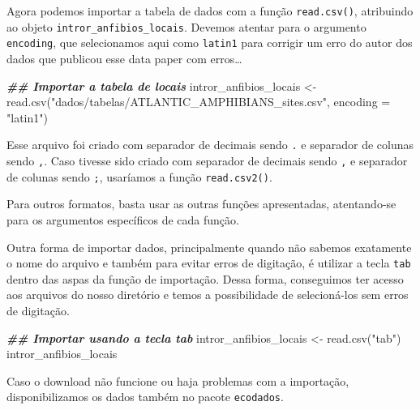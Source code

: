 \documentclass[
]{book}
\newenvironment{Shaded}{\begin{snugshade}}{\end{snugshade}}
\newcommand{\AttributeTok}[1]{\textcolor[rgb]{0.61,0.61,0.61}{#1}}
\newcommand{\DocumentationTok}[1]{\textcolor[rgb]{0.37,0.37,0.37}{\textbf{\textit{#1}}}}
\newcommand{\FunctionTok}[1]{\textcolor[rgb]{0,0,0}{#1}}
\newcommand{\NormalTok}[1]{#1}
\newcommand{\OtherTok}[1]{\textcolor[rgb]{0.37,0.37,0.37}{#1}}
\newcommand{\StringTok}[1]{\textcolor[rgb]{0.5,0.5,0.5}{#1}}
\begin{document}
Agora podemos importar a tabela de dados com a função \texttt{read.csv()}, atribuindo ao objeto \texttt{intror\_anfibios\_locais}. Devemos atentar para o argumento \texttt{encoding}, que selecionamos aqui como \texttt{latin1} para corrigir um erro do autor dos dados que publicou esse data paper com erros\ldots{}

\begin{Shaded}
\begin{Highlighting}[]
\DocumentationTok{\#\# Importar a tabela de locais}
\NormalTok{intror\_anfibios\_locais }\OtherTok{\textless{}{-}} \FunctionTok{read.csv}\NormalTok{(}\StringTok{"dados/tabelas/ATLANTIC\_AMPHIBIANS\_sites.csv"}\NormalTok{, }\AttributeTok{encoding =} \StringTok{"latin1"}\NormalTok{)}
\end{Highlighting}
\end{Shaded}

Esse arquivo foi criado com separador de decimais sendo \texttt{.} e separador de colunas sendo \texttt{,}. Caso tivesse sido criado com separador de decimais sendo \texttt{,} e separador de colunas sendo \texttt{;}, usaríamos a função \texttt{read.csv2()}.

Para outros formatos, basta usar as outras funções apresentadas, atentando-se para os argumentos específicos de cada função.

Outra forma de importar dados, principalmente quando não sabemos exatamente o nome do arquivo e também para evitar erros de digitação, é utilizar a tecla \texttt{tab} dentro das aspas da função de importação. Dessa forma, conseguimos ter acesso aos arquivos do nosso diretório e temos a possibilidade de selecioná-los sem erros de digitação.

\begin{Shaded}
\begin{Highlighting}[]
\DocumentationTok{\#\# Importar usando a tecla tab}
\NormalTok{intror\_anfibios\_locais }\OtherTok{\textless{}{-}} \FunctionTok{read.csv}\NormalTok{(}\StringTok{"\textasciigrave{}tab\textasciigrave{}"}\NormalTok{)}
\NormalTok{intror\_anfibios\_locais}
\end{Highlighting}
\end{Shaded}

Caso o download não funcione ou haja problemas com a importação, disponibilizamos os dados também no pacote \texttt{ecodados}.
\end{document}
